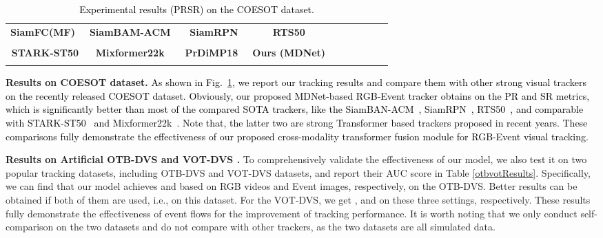 \documentclass[journal]{IEEEtran}
\begin{document}
\begin{table}[!htp]
\center
\scriptsize      
\caption{\textcolor{black}{Experimental results (PRSR) on the COESOT dataset.}} 
\label{COESOTResults} 
\begin{tabular}{cccccccccc} 	 
\hline \toprule [0.5 pt]  
\textbf{SiamFC(MF)}~\cite{bertinetto2016siamfc}  
&\textbf{SiamBAM-ACM}~\cite{han2021SiamBANACM}  
&\textbf{SiamRPN} \cite{li2018siamRPN}  
&\textbf{RTS50} \cite{paul2022RTS}  \\ 
      
&     
&     
&     \\  
\hline 
\textbf{STARK-ST50} \cite{yan2021stark} 	 
&\textbf{Mixformer22k}~\cite{cui2022mixformer}   
&\textbf{PrDiMP18}~\cite{danelljan2020PRDiMP}   
&\textbf{Ours (MDNet)} \\  
\hline 
  
&       
&       
&       	 \\ 
\hline \toprule [0.5 pt]
\end{tabular}
\end{table} 




\textbf{ Results on COESOT dataset.}
\textcolor{black}{
As shown in Fig.~\ref{COESOTResults}, we report our tracking results and compare them with other strong visual trackers on the recently released COESOT dataset. Obviously, our proposed MDNet-based RGB-Event tracker obtains  on the PR and SR metrics, which is significantly better than most of the compared SOTA trackers, like the SiamBAN-ACM~\cite{han2021SiamBANACM}, SiamRPN~\cite{li2018siamRPN}, RTS50~\cite{paul2022RTS}, and comparable with STARK-ST50~\cite{yan2021stark} and Mixformer22k~\cite{cui2022mixformer}. Note that, the latter two are strong Transformer based trackers proposed in recent years. These comparisons fully demonstrate the effectiveness of our proposed cross-modality transformer fusion module for RGB-Event visual tracking. 
}







\textbf{ Results on Artificial OTB-DVS \cite{wu2015OTB} and VOT-DVS \cite{vot2019seventh}.}
To comprehensively validate the effectiveness of our model, we also test it on two popular tracking datasets, including OTB-DVS and VOT-DVS datasets, and report their AUC score in Table \ref{otbvotResults}. Specifically, we can find that our model achieves  and  based on RGB videos and Event images, respectively, on the OTB-DVS. Better results can be obtained if both of them are used, i.e.,  on this dataset. For the VOT-DVS, we get , and   on these three settings, respectively. These results fully demonstrate the effectiveness of event flows for the improvement of tracking performance. It is worth noting that we only conduct self-comparison on the two datasets and do not compare with other trackers, as the two datasets are all simulated data.
\end{document}
